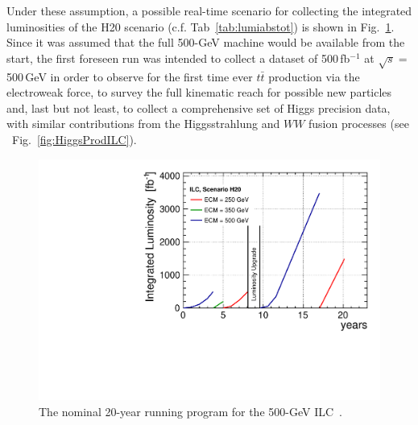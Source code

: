 Under these assumption, a possible real-time scenario for collecting
the integrated luminosities of the H20 scenario (c.f. Tab~\ref{tab:lumiabstot}) is shown in Fig.~\ref{fig:H20}. Since 
it was assumed that the full 500-GeV machine would be available from the start, the first foreseen run was intended to collect a dataset of 500\,fb$^{-1}$ at $\sqrt{s}=$500\,GeV in order to observe for the first time ever $t\bar{t}$ production via the electroweak force,
to survey the full kinematic reach for possible new particles and, last but not least, to collect a comprehensive set of Higgs precision data, with similar contributions from the Higgsstrahlung and $WW$ fusion processes (see \ Fig.~\ref{fig:HiggsProdILC}). 

\begin{figure}
\begin{center}
\includegraphics[width=0.85\hsize]{chapters/figures/lumi_H20.pdf}
\end{center}
\caption{The nominal 20-year running program for the 500-GeV ILC~\cite{Barklow:2015tja}.}
\label{fig:H20}
\end{figure}

